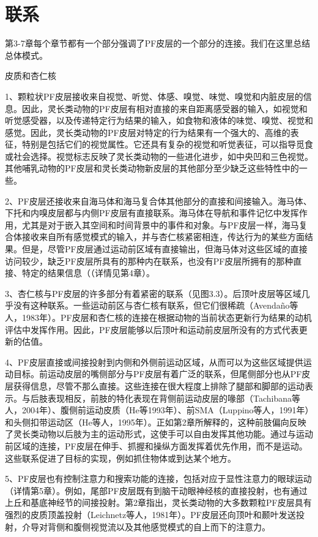\section{联系}
第3-7章每个章节都有一个部分强调了PF皮层的一个部分的连接。我们在这里总结总体模式。

皮质和杏仁核

1、颗粒状PF皮层接收来自视觉、听觉、体感、嗅觉、味觉、嗅觉和内脏皮层的信息。因此，灵长类动物的PF皮层有相对直接的来自距离感受器的输入，如视觉和听觉感受器，以及传递特定行为结果的输入，如食物和液体的味觉、嗅觉、视觉和感觉。因此，灵长类动物的PF皮层对特定的行为结果有一个强大的、高维的表征，特别是包括它们的视觉属性。它还具有复杂的视觉和听觉表征，可以指导觅食或社会选择。视觉标志反映了灵长类动物的一些进化进步，如中央凹和三色视觉。其他哺乳动物的PF皮层和灵长类动物新皮层的其他部分至少缺乏这些特性中的一些。

2、PF皮层还接收来自海马体和海马复合体其他部分的直接和间接输入。海马体、下托和内嗅皮层都与内侧PF皮层有直接联系。海马体在导航和事件记忆中发挥作用，尤其是对于嵌入其空间和时间背景中的事件和对象。与PF皮层一样，海马复合体接收来自所有感觉模式的输入，并与杏仁核紧密相连，传达行为的某些方面结果。但是，尽管PF皮层通过运动前区域有直接输出，但海马体对这些区域的直接访问较少，缺乏PF皮层所具有的那种内在联系，也没有PF皮层所拥有的那种直接、特定的结果信息（（详情见第4章）。

3、杏仁核与PF皮层的许多部分有着紧密的联系（见图3.3）。后顶叶皮层等区域几乎没有这种联系。一些运动前区与杏仁核有联系，但它们很稀疏（Avendaño等人，1983年）。PF皮层和杏仁核的连接在根据动物的当前状态更新行为结果的动机评估中发挥作用。因此，PF皮层能够以后顶叶和运动前皮层所没有的方式代表更新的估值。

4、PF皮层直接或间接投射到内侧和外侧前运动区域，从而可以为这些区域提供运动目标。前运动皮层的嘴侧部分与PF皮层有着广泛的联系，但尾侧部分也从PF皮层获得信息，尽管不那么直接。这些连接在很大程度上排除了腿部和脚部的运动表示。与后肢表现相反，前肢的特化表现在背侧前运动皮层的喙部（Tachibana等人，2004年）、腹侧前运动皮质（He等1993年）、前SMA（Luppino等人，1991年）和头侧扣带运动区（He等人，1995年）。正如第2章所解释的，这种前肢偏向反映了灵长类动物以后肢为主的运动形式，这使手可以自由发挥其他功能。通过与运动前区域的连接，PF皮层在伸手、抓握和操纵方面发挥着优先作用，而不是运动。这些联系促进了目标的实现，例如抓住物体或到达某个地方。

5、PF皮层也有控制注意力和搜索功能的连接，包括对应于显性注意力的眼球运动（详情第5章）。例如，尾部PF皮层既有到脑干动眼神经核的直接投射，也有通过上丘和基底神经节的间接投射。第2章指出，灵长类动物的大多数颗粒PF皮层具有强烈的皮质顶盖投射（Leichnetz等人，1981年）。PF皮层还向顶叶和颞叶发送投射，介导对背侧和腹侧视觉流以及其他感觉模式的自上而下的注意力。

